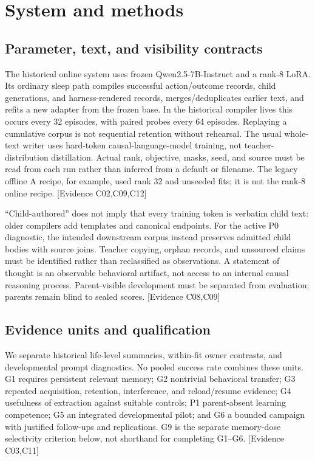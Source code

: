 \documentclass[11pt]{article}
\newcommand{\ev}[1]{\textsf{[Evidence #1]}}
\begin{document}
\section{System and methods}
\subsection{Parameter, text, and visibility contracts}
The historical online system uses frozen Qwen2.5-7B-Instruct and a rank-8 LoRA.
Its ordinary sleep path compiles successful action/outcome records, child
generations, and harness-rendered records, merges/deduplicates earlier text, and
refits a new adapter from the frozen base. In the historical compiler lives this
occurs every 32 episodes, with paired probes every 64 episodes. Replaying a
cumulative corpus is not sequential retention without rehearsal. The usual
whole-text writer uses hard-token causal-language-model training, not
teacher-distribution distillation. Actual rank, objective, masks, seed, and source
must be read from each run rather than inferred from a default or filename.
The legacy offline A recipe, for example, used rank 32 and unseeded fits; it is
not the rank-8 online recipe. \ev{C02,C09,C12}

``Child-authored'' does not imply that every training token is verbatim child
text: older compilers add templates and canonical endpoints. For the active P0
diagnostic, the intended downstream corpus instead preserves admitted child
bodies with source joins. Teacher copying, orphan records, and unsourced claims
must be identified rather than reclassified as observations. A statement of
thought is an observable behavioral artifact, not access to an internal causal
reasoning process. Parent-visible development must be separated from evaluation;
parents remain blind to sealed scores. \ev{C08,C09}

\subsection{Evidence units and qualification}
We separate historical life-level summaries, within-fit owner contrasts, and
developmental prompt diagnostics. No pooled success rate combines these units.
G1 requires persistent relevant memory; G2 nontrivial behavioral transfer; G3
repeated acquisition, retention, interference, and reload/resume evidence; G4
usefulness of extraction against suitable controls; P1 parent-absent learning
competence; G5 an integrated developmental pilot; and G6 a bounded campaign with
justified follow-ups and replications. G9 is the separate memory-dose selectivity
criterion below, not shorthand for completing G1--G6. \ev{C03,C11}
\end{document}
